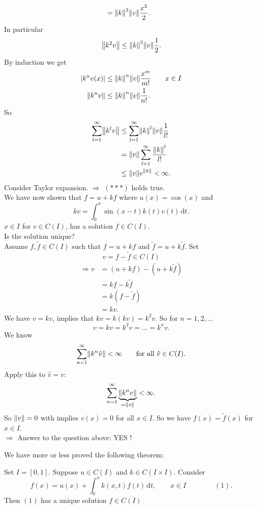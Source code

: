\begin{enumerate}[1.]
\begin{align*}
		&= \norm{k}^2 \norm{v} \frac{x^2}{2}.
	\end{align*}
	In particular
	\[
		\norm{k^2v} \leq \norm{k}^2 \norm{v} \frac{1}{2}.
	\]
	By induction we get
	\begin{align*}
		\abs{k^n v(x)} &\leq \norm{k}^n \norm{v} \frac{x^m}{m!} \qquad x \in I \\
		\norm{k^n v} &\leq  \norm{k}^n \norm{v} \frac{1}{n!}.
	\end{align*}
	So 
	\begin{align*}
		\sum_{l=1}^{\infty}\norm{k^lv} &\leq \sum_{l=1}^{\infty}\norm{k}^l \norm{v} \frac{1}{l!} \\
		&= \norm{v} \sum_{l=1}^{\infty} \frac{\norm{k}^l}{l!} \\
		&\leq \norm{v} e^{\norm{k}} < \infty.
	\end{align*}
	Consider Taylor expansion.
	$\Rightarrow $ $(***)$ holds true. \\
	We have now shown that $f = u+kf$ where $u(x) = \cos(x)$ and
	\[
		kv = \int_{0}^{x}\sin(x-t)k(t)v(t) \,\mathrm{d}t.
	\]
	$x \in I$ for $v \in C(I)$, has a solution $f \in C(I)$. \\
	 Is the solution unique? \\
	Assume $f,\tilde f \in C(I)$ such that $f = u + k f$ and $\tilde f = u+ k \tilde f$. Set 
	\[
		v = f- \tilde f \in C(I)
	\]
	\begin{align*}
		\Rightarrow v &= (u+kf) - (u+ k \tilde f) \\ &= kf - k \tilde f \\ &= k(f- \tilde f) \\ &= kv.
	\end{align*}
	We have $v = kv$, implies that $kv = k(kv) = k^2v$. So for $n=1,2,\dots$
	\[
		v = kv = k^2v = \dots = k^nv.
	\]
	We know 
	\[
		\sum_{n=1}^{\infty}\norm{k^n \hat{v}} < \infty \qquad \text{for all }\hat{v} \in C(I).
	\]
	Apply this to $\hat{v}=v$:
	\[
		\sum_{n=1}^{\infty}\underset{=\norm{v}}{\underbrace{\norm{k^nv}}} < \infty .
	\]
	So $\norm{v}=0$ with implies $v(x)=0$ for all $x \in I$.
	So we have $f(x)=\tilde f(x)$ for $x \in I$. \\
	$\Rightarrow $ Answer to the question above: YES ! 
\end{enumerate}
We have more or less proved the following theorem:
\begin{theorem}
	Set $I=[0,1]$. Suppose $u \in C(I)$ and $k \in C(I \times I)$. Consider 
	\[
		f(x) = u(x)+ \int_{0}^{x} k(x,t) f(t) \,\mathrm{d}t, \qquad x \in I \qquad \qquad (1).
	\]
	Then $(1)$ has a unique solution $f \in C(I)$
\end{theorem}
